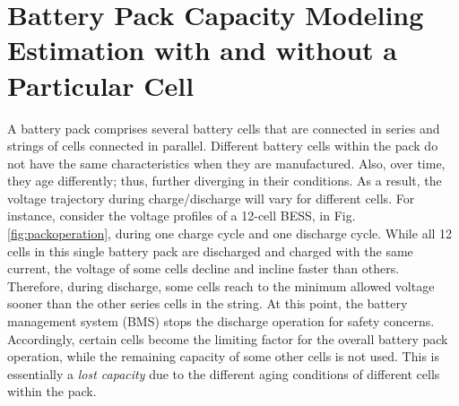 \documentclass[10pt,twocolumn]{IEEEtran}
\begin{document}



\section{Battery Pack Capacity Modeling Estimation with and without a Particular Cell}

A  battery pack comprises several battery  cells that are connected in series and strings of cells  connected in parallel. 
Different battery  cells within the pack do not have the same characteristics when they are manufactured.
 Also, over time, they age differently; thus, further  diverging in their  conditions.
As a result,  the voltage trajectory during charge/discharge will vary for different cells.
For instance, consider the voltage profiles of a 12-cell BESS,   in Fig. \ref{fig:packoperation}, during one charge  cycle and one discharge cycle.
While all 12 cells in this single battery pack are discharged and charged with the same current, the voltage of some cells decline and incline faster than others.
%
%
Therefore, during discharge, some cells  reach to the minimum allowed voltage sooner than the other series cells in the  string.
At this point,  the battery management system (BMS) stops the discharge operation for safety concerns.
Accordingly, certain cells become the limiting factor for the overall  battery pack operation, 
while the remaining capacity of some other cells is not used. 
This is essentially a \emph{lost capacity} due to the different aging conditions of different cells within the pack. 
\end{document}
